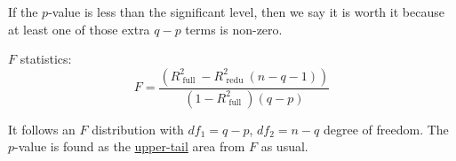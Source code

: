 \documentclass[12pt]{article}
\begin{document}
If the $ p $-value is less than the significant level, then we say
it is worth it because at least one of those extra $ q - p $ terms
is non-zero.


$ F $ statistics:
\begin{equation*}
F = \frac{
		(R_{\text{ full }}^{2} - R^{2}_{\text{ redu }}(n - q - 1))
}
{(1 - R^{2}_{\text{ full }})(q - p)}
\end{equation*}

It follows an $ F $ distribution with $ df_1 = q - p $, 
$ df_2 = n - q $ degree of freedom. The $ p $-value is found as the
{\underline {upper-tail}} area from $ F $ as usual.
\end{document}
